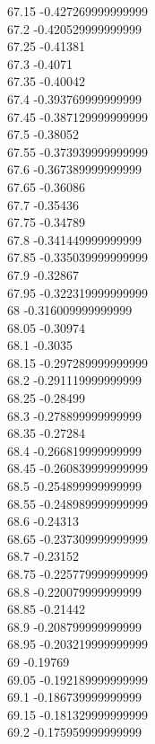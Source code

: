 {67.15	-0.427269999999999\\
67.2	-0.420529999999999\\
67.25	-0.41381\\
67.3	-0.4071\\
67.35	-0.40042\\
67.4	-0.393769999999999\\
67.45	-0.387129999999999\\
67.5	-0.38052\\
67.55	-0.373939999999999\\
67.6	-0.367389999999999\\
67.65	-0.36086\\
67.7	-0.35436\\
67.75	-0.34789\\
67.8	-0.341449999999999\\
67.85	-0.335039999999999\\
67.9	-0.32867\\
67.95	-0.322319999999999\\
68	-0.316009999999999\\
68.05	-0.30974\\
68.1	-0.3035\\
68.15	-0.297289999999999\\
68.2	-0.291119999999999\\
68.25	-0.28499\\
68.3	-0.278899999999999\\
68.35	-0.27284\\
68.4	-0.266819999999999\\
68.45	-0.260839999999999\\
68.5	-0.254899999999999\\
68.55	-0.248989999999999\\
68.6	-0.24313\\
68.65	-0.237309999999999\\
68.7	-0.23152\\
68.75	-0.225779999999999\\
68.8	-0.220079999999999\\
68.85	-0.21442\\
68.9	-0.208799999999999\\
68.95	-0.203219999999999\\
69	-0.19769\\
69.05	-0.192189999999999\\
69.1	-0.186739999999999\\
69.15	-0.181329999999999\\
69.2	-0.175959999999999\\
}
